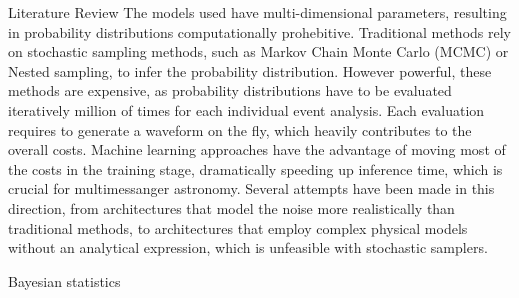 \documentclass[a4paper, 12pt, twoside, openright, titlepage]{book}
\begin{document}
\begin{chapter}{Literature Review}
The models used have multi-dimensional parameters, resulting in probability distributions computationally prohebitive. 
Traditional methods rely on stochastic sampling methods, such as Markov Chain Monte Carlo (MCMC) or Nested sampling, to infer the probability distribution.
However powerful, these methods are expensive, as probability distributions have to be evaluated iteratively million of times for each individual event analysis. 
Each evaluation requires to generate a waveform on the fly, which heavily contributes to the overall costs.
Machine learning approaches have the advantage of moving most of the costs 
in the training stage, dramatically speeding up inference time, which is crucial for multimessanger astronomy.
Several attempts have been made in this direction, from architectures that model the noise more realistically than traditional methods, to architectures that employ complex physical models without an analytical expression, which is unfeasible with stochastic samplers.

\begin{section}{Bayesian statistics}


\end{section}
\end{chapter}
\end{document}
